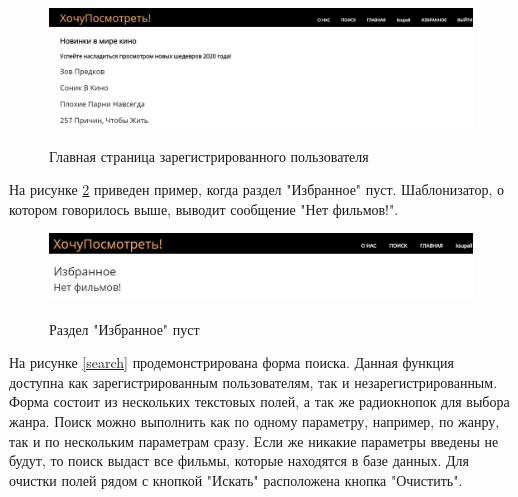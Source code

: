 \documentclass[a4paper, 14pt]{article}
\begin{document}
	\newpage
	\begin{figure}[h!]
		{\includegraphics[scale=0.5]{img/8.JPG}}
		\caption{Главная страница зарегистрированного пользователя}
		\label{home2}
	\end{figure}

	На рисунке \ref{saved1} приведен пример, когда раздел "Избранное" пуст. Шаблонизатор, о котором говорилось выше, выводит сообщение "Нет фильмов!".
	
	\begin{figure}[h!]
		{\includegraphics[scale=0.6]{img/9.JPG}}
		\caption{Раздел "Избранное" пуст}
		\label{saved1}
	\end{figure}

	На рисунке \ref{search} продемонстрирована форма поиска. Данная функция доступна как зарегистрированным пользователям, так и незарегистрированным. Форма состоит из нескольких текстовых полей, а так же радиокнопок для выбора жанра. Поиск можно выполнить как по одному параметру, например, по жанру, так и по нескольким параметрам сразу. Если же никакие параметры введены не будут, то поиск выдаст все фильмы, которые находятся в базе данных. Для очистки полей рядом с кнопкой "Искать" расположена кнопка "Очистить".
	\newpage
\end{document}
